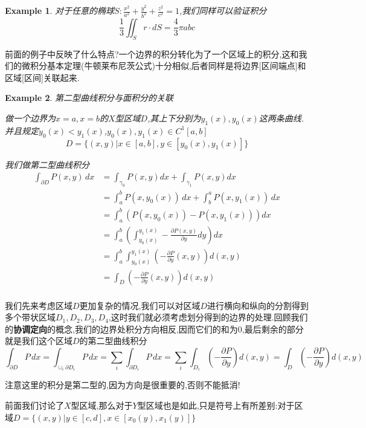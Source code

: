 \documentclass[11pt,hyperref,a4paper,UTF8]{ctexart}
\newtheorem{example}{Example}[subsection]
\newcommand{\parameter}[1]{\left(#1\right)}
\begin{document}
\begin{CJK}{UTF8}{gkai}
\begin{example}
  对于任意的椭球$S : \frac{x^2}{a^2} + \frac{y^2}{b^2} + \frac{z^2}{c^2} = 1$,我们同样可以验证积分
  \[\frac{1}{3}\iint_S r \cdot dS = \frac{4}{3}\pi abc\]
\end{example}

前面的例子中反映了什么特点?一个边界的积分转化为了一个区域上的积分,这和我们的微积分基本定理(牛顿莱布尼茨公式)十分相似,后者同样是将边界[区间端点]和区域[区间]关联起来.

\begin{example}
  第二型曲线积分与面积分的关联

  做一个边界为$x = a,x = b$的$X$型区域$D$,其上下分别为$y_1(x),y_0(x)$这两条曲线.并且规定$y_0(x) < y_1(x)$,$y_0(x),y_1(x) \in C^1[a,b]$
  \[D = \{(x,y)| x \in [a,b] ,y \in [y_0(x),y_1(x)]\}\]

  我们做第二型曲线积分
  \[
  \begin{aligned}
    \int_{\partial D} P(x,y)\, dx &= \int_{\gamma_0} P(x,y)dx + \int_{\gamma_1} P(x,y)dx\\
    &= \int_{a}^b P(x,y_0(x))\, dx + \int_b^a P(x,y_1(x))\, dx\\
    &= \int_a^b \parameter{P(x,y_0(x)) - P(x,y_1(x))} dx\\
    &= \int_a^b \parameter{\int_{y_0(x)}^{y_1(x)} - \frac{\partial P(x,y)}{\partial y} dy}dx\\
    &= \int_a^b \int_{y_0(x)}^{y_1(x)} \parameter{-\frac{\partial P}{\partial y}(x,y)}d(x,y)\\
    &= \int_D \parameter{-\frac{\partial P}{\partial y}(x,y)}d(x,y)\\
  \end{aligned}  
  \]
\end{example}

我们先来考虑区域$D$更加复杂的情况,我们可以对区域$D$进行横向和纵向的分割得到多个带状区域$D_1,D_2,D_3,D_4$,这时我们就必须考虑划分得到的边界的处理.回顾我们的\textbf{协调定向}的概念,我们的边界处积分方向相反,因而它们的和为$0$,最后剩余的部分就是我们这个区域$D$的第二型曲线积分
\[\int_{\partial D} P\, dx = \int_{\cup_i \partial D_i} P \, dx = \sum_{i} \int_{\partial D_i} P\, dx = \sum_{i} \int_{D_i} \parameter{-\frac{\partial P}{\partial y}} d(x,y) = \int_D \parameter{-\frac{\partial P}{\partial y}} d(x,y)\]

注意这里的积分是第二型的,因为方向是很重要的,否则不能抵消!

前面我们讨论了$X$型区域,那么对于$Y$型区域也是如此,只是符号上有所差别:对于区域$D = \{(x,y)| y\in [c,d], x \in [x_0(y),x_1(y)]\}$


\end{CJK}
\end{document}
